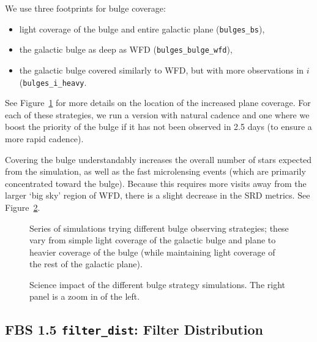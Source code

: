 We use three footprints for bulge coverage: 
\begin{itemize}
\item light coverage of the bulge and entire galactic plane ({\tt bulges\_bs}),
\item the galactic bulge as deep as WFD ({\tt bulges\_bulge\_wfd}), 
\item the galactic bulge covered similarly to WFD, but with more observations in $i$ ({\tt bulges\_i\_heavy}.  
\end{itemize}
See Figure~\ref{fig:bulge} for more details on the location of the increased plane coverage. 
For each of these strategies, we run a version with natural cadence and one where we boost the priority of the bulge if it has not been observed in 2.5 days (to ensure a more rapid cadence). 

Covering the bulge understandably increases the overall number of stars expected from the simulation, as well as the fast microlensing events (which are primarily concentrated toward the bulge). Because this requires more visits away from the larger `big sky' region of WFD, there is a slight decrease in the SRD metrics. See Figure~\ref{fig:bulge_radar}. 

\begin{figure}
\caption{Series of simulations trying different bulge observing strategies; these vary from simple light coverage of the galactic bulge and plane to heavier coverage of the bulge (while maintaining light coverage of the rest of the galactic plane).}\label{fig:bulge}
\end{figure}

\begin{figure}
\caption{Science impact of the different bulge strategy simulations. The right panel is a zoom in of the left.}\label{fig:bulge_radar}
\end{figure}


\subsection{FBS 1.5 {\tt filter\_dist}: Filter Distribution}\label{ss:filterdist}

